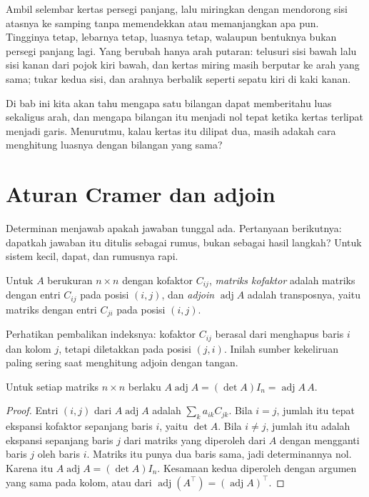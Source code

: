 \begin{untukanak}
Ambil selembar kertas persegi panjang, lalu miringkan dengan mendorong sisi atasnya ke samping
tanpa memendekkan atau memanjangkan apa pun. Tingginya tetap, lebarnya tetap, luasnya tetap,
walaupun bentuknya bukan persegi panjang lagi. Yang berubah hanya arah putaran: telusuri sisi
bawah lalu sisi kanan dari pojok kiri bawah, dan kertas miring masih berputar ke arah yang
sama; tukar kedua sisi, dan arahnya berbalik seperti sepatu kiri di kaki kanan.

Di bab ini kita akan tahu mengapa satu bilangan dapat memberitahu luas sekaligus arah, dan
mengapa bilangan itu menjadi nol tepat ketika kertas terlipat menjadi garis. Menurutmu, kalau
kertas itu dilipat dua, masih adakah cara menghitung luasnya dengan bilangan yang sama?
\end{untukanak}

\section{Aturan Cramer dan adjoin}

Determinan menjawab apakah jawaban tunggal ada. Pertanyaan berikutnya: dapatkah jawaban itu
ditulis sebagai rumus, bukan sebagai hasil langkah? Untuk sistem kecil, dapat, dan rumusnya
rapi.


\begin{definisi}[Adjoin]
Untuk $A$ berukuran $n\times n$ dengan kofaktor $C_{ij}$, \emph{matriks kofaktor} adalah
matriks dengan entri $C_{ij}$ pada posisi $(i,j)$, dan \emph{adjoin}
$\operatorname{adj}A$ adalah transposnya, yaitu matriks dengan entri $C_{ji}$ pada posisi
$(i,j)$.
\end{definisi}

Perhatikan pembalikan indeksnya: kofaktor $C_{ij}$ berasal dari menghapus baris $i$ dan kolom
$j$, tetapi diletakkan pada posisi $(j,i)$. Inilah sumber kekeliruan paling sering saat
menghitung adjoin dengan tangan.

\begin{teorema}
Untuk setiap matriks $n\times n$ berlaku $A\operatorname{adj}A
=(\det A)I_{n}=\operatorname{adj}A\,A$.
\end{teorema}

\begin{proof}
Entri $(i,j)$ dari $A\operatorname{adj}A$ adalah
$\sum_{k}a_{ik}C_{jk}$. Bila $i=j$, jumlah itu tepat ekspansi kofaktor sepanjang baris $i$,
yaitu $\det A$. Bila $i\neq j$, jumlah itu adalah ekspansi sepanjang baris $j$ dari matriks
yang diperoleh dari $A$ dengan mengganti baris $j$ oleh baris $i$. Matriks itu punya dua
baris sama, jadi determinannya nol. Karena itu $A\operatorname{adj}A=(\det A)I_{n}$.
Kesamaan kedua diperoleh dengan argumen yang sama pada kolom, atau dari
$\operatorname{adj}(A^{\top})=(\operatorname{adj}A)^{\top}$.
\end{proof}

